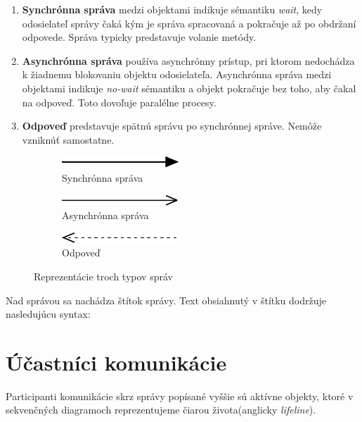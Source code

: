 \begin{enumerate}
	\item \textbf{Synchrónna správa} medzi objektami indikuje  sémantiku \emph{wait}, kedy  odosielateľ správy čaká kým je správa spracovaná a pokračuje až po obdržaní odpovede. Správa typicky predstavuje volanie metódy.
	\item \textbf{Asynchrónna správa} používa asynchrónny prístup, pri ktorom nedochádza k žiadnemu blokovaniu objektu odosielateľa. Asynchrónna správa medzi objektami indikuje \emph{no-wait} sémantiku a objekt pokračuje bez toho, aby čakal na odpoveď. Toto dovoľuje paralélne procesy.
	\item \textbf{Odpoveď} predstavuje spätnú správu po synchrónnej správe. Nemôže vzniknúť samostatne.
\end{enumerate}

\begin{figure}[H]
	\centering
	\begin{subfigure}[t]{.3\textwidth}
		\centering
		\includegraphics{obrazky-figures/SD-sync}
		\caption{Synchrónna správa}
	\end{subfigure}
	\begin{subfigure}[t]{.3\textwidth}
		\centering
		\includegraphics{obrazky-figures/SD-async}
		\caption{Asynchrónna správa}
	\end{subfigure}
\begin{subfigure}[t]{.3\textwidth}
	\centering
	\includegraphics{obrazky-figures/SD-reply}
	\caption{Odpoveď}
\end{subfigure}
	\caption{Reprezentácie troch typov správ}
	\label{fig:arrows}
\end{figure}

Nad správou sa nachádza štítok správy. Text obsiahnutý v štítku dodržuje nasledujúcu syntax:



\section{Účastníci komunikácie}
Participanti komunikácie skrz správy popísané vyššie sú aktívne objekty, ktoré v sekvenčných diagramoch reprezentujeme čiarou života(anglicky \emph{lifeline}).

